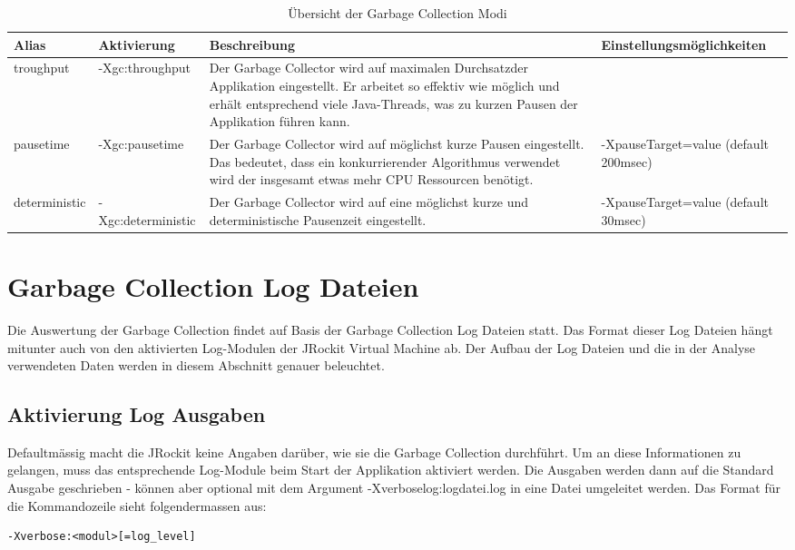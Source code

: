   \begin{longtable}{|p{2.5cm}|p{3.1cm}|p{4.5cm}|p{4cm}|}
    \caption{Übersicht der Garbage Collection Modi}\\\hline
  \textbf{Alias} & \textbf{Aktivierung} & \textbf{Beschreibung} & Einstellungsmöglichkeiten\\\hline
  troughput & -Xgc:throughput & Der Garbage Collector wird auf maximalen Durchsatzder Applikation eingestellt. Er arbeitet so effektiv wie möglich und erhält entsprechend viele Java-Threads, was zu kurzen Pausen der Applikation führen kann. & \\\hline
  pausetime & -Xgc:pausetime & Der Garbage Collector wird auf möglichst kurze Pausen eingestellt. Das bedeutet, dass ein konkurrierender Algorithmus verwendet wird der insgesamt etwas mehr CPU Ressourcen benötigt. & -XpauseTarget=value (default 200msec)\\\hline
  deterministic & -Xgc:deterministic & Der Garbage Collector wird auf eine möglichst kurze und deterministische Pausenzeit eingestellt. &-XpauseTarget=value (default 30msec)\\\hline

\end{longtable}

\section{Garbage Collection Log Dateien}\label{jrockitgclog}
Die Auswertung der Garbage Collection findet auf Basis der Garbage Collection Log Dateien statt. Das Format dieser Log Dateien hängt mitunter auch von den aktivierten Log-Modulen der JRockit Virtual Machine ab. Der Aufbau der Log Dateien und die in der Analyse verwendeten Daten werden in diesem Abschnitt genauer beleuchtet.

\subsection{Aktivierung Log Ausgaben}
Defaultmässig macht die JRockit keine Angaben darüber, wie sie die Garbage Collection durchführt. Um an diese Informationen zu gelangen, muss das entsprechende Log-Module beim Start der Applikation aktiviert werden. Die Ausgaben werden dann auf die Standard Ausgabe geschrieben - können aber optional mit dem Argument -Xverboselog:logdatei.log in eine Datei umgeleitet werden. Das Format für die Kommandozeile sieht folgendermassen aus:

\begin{lstlisting}[caption=Format Aktivierung Log Modul]
-Xverbose:<modul>[=log_level]
\end{lstlisting}

